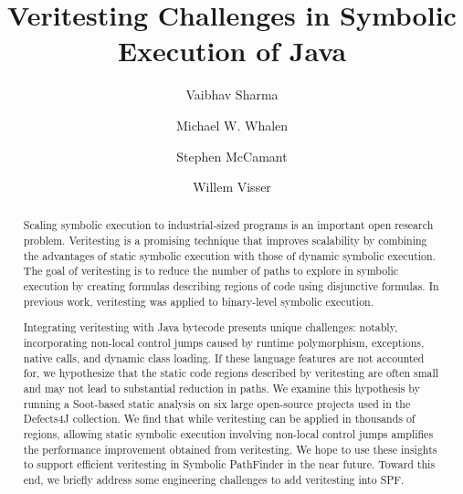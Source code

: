 \documentclass{acm_sen_article}
\begin{document}
\title{Veritesting Challenges in Symbolic Execution of Java}
\author[1]{Vaibhav Sharma}
\author[1]{Michael W. Whalen}
\author[1]{Stephen McCamant}
\author[2]{Willem Visser}
% 
% 
% 


\maketitle
\begin{abstract}
Scaling symbolic execution to industrial-sized programs is an important open research problem.
%
Veritesting is a promising technique that improves scalability by combining the advantages of static symbolic execution with those of dynamic symbolic execution.  The goal of veritesting is to reduce the number of paths to explore in symbolic execution by creating formulas describing regions of code using disjunctive formulas.
%
In previous work, veritesting was applied to binary-level symbolic execution.

Integrating veritesting with Java bytecode presents unique challenges:
notably, incorporating non-local control jumps caused by runtime polymorphism, exceptions, native calls, and dynamic class loading.
%
If these language features are not accounted for, we hypothesize that the static code regions described by veritesting are often small and may not lead to substantial reduction in paths.  We examine this hypothesis by running a Soot-based static analysis on six large open-source projects used in the Defects4J collection.
%
We find that while veritesting can be applied in thousands of regions, allowing static symbolic execution involving non-local control jumps amplifies the performance improvement obtained from veritesting.
%
We hope to use these insights to support efficient veritesting in Symbolic PathFinder in the near future.  Toward this end, we briefly address some engineering challenges to add veritesting into SPF.
\end{abstract}
\end{document}

